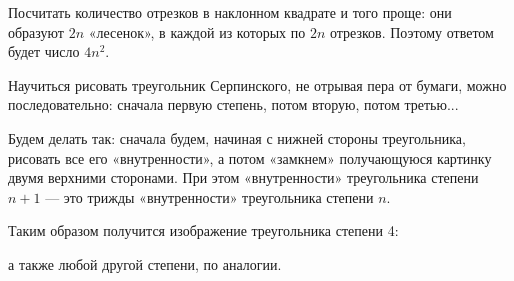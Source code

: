\begin{itemize}
\vspace{-0.4cm}
Посчитать количество отрезков в наклонном квадрате и того проще: они образуют $2n$ «лесенок», в каждой из которых по $2n$ отрезков. Поэтому ответом будет число $4n^2$.

\itC Научиться рисовать треугольник Серпинского, не отрывая пера от бумаги, можно последовательно: сначала первую степень, потом вторую, потом третью...

Будем делать так: сначала будем, начиная с нижней стороны треугольника, рисовать все его «внутренности», а потом «замкнем» \linebreak получающуюся картинку двумя верхними сторонами. При этом \linebreak «внутренности» треугольника степени $n+1$ — это трижды «внутренности» треугольника степени $n$.

Таким образом получится изображение треугольника степени 4:

\begin{center}  \end{center}

а также любой другой степени, по аналогии.
\end{itemize}